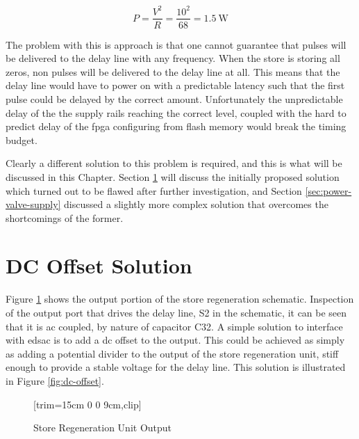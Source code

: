 \begin{equation}
P = \frac{V^2}{R} = \frac{10^2}{68} = \SI{1.5}{\watt} \label{eq:power-delivered-to-load}
\end{equation}

The problem with this is approach is that one cannot guarantee that pulses will be delivered to the delay line with any frequency. When the store is storing all zeros, non pulses will be delivered to the delay line at all. This means that the delay line would have to power on with a predictable latency such that the first pulse could be delayed by the correct amount. Unfortunately the unpredictable delay of the the supply rails reaching the correct level, coupled with the hard to predict delay of the \gls{fpga} configuring from flash memory would break the timing budget.

Clearly a different solution to this problem is required, and this is what will be discussed in this Chapter. Section \ref{sec:power-dc-offset} will discuss the initially proposed solution which turned out to be flawed after further investigation, and Section \ref{sec:power-valve-supply} discussed a slightly more complex solution that overcomes the shortcomings of the former.


\section{DC Offset Solution} \label{sec:power-dc-offset}
Figure \ref{fig:store-regen-output} shows the output portion of the store regeneration schematic. Inspection of the output port that drives the delay line, S2 in the schematic, it can be seen that it is \gls{ac} coupled, by nature of capacitor C32. A simple solution to interface with \gls{edsac} is to add a \gls{dc} offset to the output. This could be achieved as simply as adding a potential divider to the output of the store regeneration unit, stiff enough to provide a stable voltage for the delay line. This solution is illustrated in Figure \ref{fig:dc-offset}.

\begin{figure}[ht]
	\centering
	[trim={15cm 0 0 9cm},clip] %
	\caption{Store Regeneration Unit Output \cite{burton2014b}}
	\label{fig:store-regen-output}
\end{figure}


